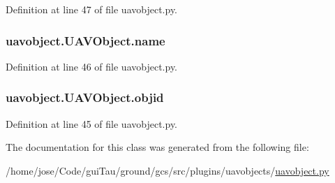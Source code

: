 Definition at line 47 of file uavobject.\-py.

\hypertarget{classuavobject_1_1_u_a_v_object_a18e778e490804c6beb88c60b40e6cf70}{
\subsubsection[{name}]{\setlength{\rightskip}{0pt plus 5cm}uavobject.\-U\-A\-V\-Object.\-name}}\label{classuavobject_1_1_u_a_v_object_a18e778e490804c6beb88c60b40e6cf70}


Definition at line 46 of file uavobject.\-py.

\hypertarget{classuavobject_1_1_u_a_v_object_a3b1453f9df2858ac082089867cc91667}{
\subsubsection[{objid}]{\setlength{\rightskip}{0pt plus 5cm}uavobject.\-U\-A\-V\-Object.\-objid}}\label{classuavobject_1_1_u_a_v_object_a3b1453f9df2858ac082089867cc91667}


Definition at line 45 of file uavobject.\-py.



The documentation for this class was generated from the following file\-:\begin{DoxyCompactItemize}
\item 
/home/jose/\-Code/gui\-Tau/ground/gcs/src/plugins/uavobjects/\hyperlink{uavobject_8py}{uavobject.\-py}\end{DoxyCompactItemize}
